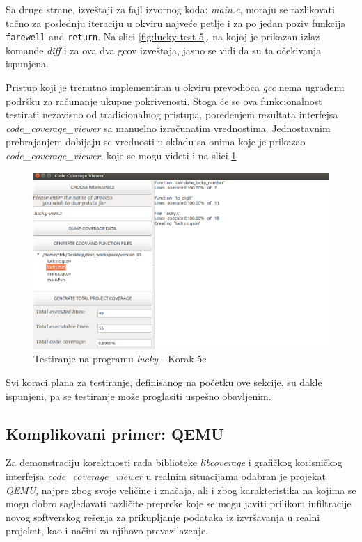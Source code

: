 \documentclass[12pt,oneside]{memoir}
\newcommand{\kod}[1]{\texttt{#1}}
\newcommand{\strano}[1]{\textit{#1}}
\begin{document}
Sa druge strane, izveštaji za fajl izvornog koda: \strano{main.c}, moraju se razlikovati tačno za poslednju iteraciju u okviru najveće petlje i za po jedan poziv funkcija \kod{farewell} and \kod{return}. Na slici \ref{fig:lucky-test-5}. na kojoj je prikazan izlaz komande \strano{diff} i za ova dva gcov izveštaja, jasno se vidi da su ta očekivanja ispunjena. 

Pristup koji je trenutno implementiran u okviru prevodioca \strano{gcc} nema ugrađenu podršku za računanje ukupne pokrivenosti. Stoga će se ova funkcionalnost testirati nezavisno od tradicionalnog pristupa, poređenjem rezultata interfejsa \strano{code\_coverage\_viewer} sa manuelno izračunatim vrednostima. Jednostavnim prebrajanjem dobijaju se vrednosti u skladu sa onima koje je prikazao \strano{code\_coverage\_viewer}, koje se mogu videti i na slici \ref{fig:lucky-test-7}

\begin{figure}[!ht]
  \centering
  \includegraphics[width=\textwidth]{img/lucky7.png}
  \caption{Testiranje na programu \strano{lucky} - Korak 5c}
  \label{fig:lucky-test-7}
\end{figure}

Svi koraci plana za testiranje, definisanog na početku ove sekcije, su dakle ispunjeni, pa se testiranje može proglasiti uspešno obavljenim. 


\subsection{Komplikovani primer: QEMU}

Za demonstraciju korektnosti rada biblioteke \strano{libcoverage} i grafičkog korisničkog interfejsa \strano{code\_coverage\_viewer} u realnim situacijama odabran je projekat \strano{QEMU}, najpre zbog svoje veličine i značaja, ali i zbog karakteristika na kojima se mogu dobro sagledavati različite prepreke koje se mogu javiti prilikom infiltracije novog softverskog rešenja za prikupljanje podataka iz izvršavanja u realni projekat, kao i načini za njihovo prevazilazenje.
\end{document}
